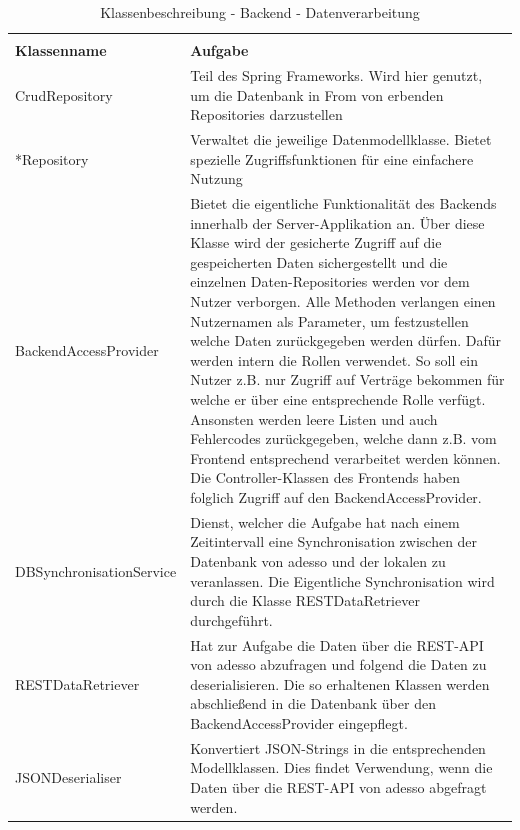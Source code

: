 \clearpage

\begin{center}
\begin{longtable}[h]{p{5cm} p{9cm}}
	\caption{Klassenbeschreibung - Backend - Datenverarbeitung}
	\label{table:klassenbeschreibung-backend-data}
	\endlastfoot
	\multicolumn{2}{r}{{Weitergeführt auf der folgenden Seite}} \\
	\endfoot
	\endhead
	\rowcolor[HTML]{C0C0C0} 
	\textbf{Klassenname} & \textbf{Aufgabe} \\
    CrudRepository & Teil des Spring Frameworks. Wird hier genutzt, um die Datenbank in From von erbenden Repositories darzustellen \\
	\rowcolor[HTML]{E7E7E7} 
	*Repository & Verwaltet die jeweilige Datenmodellklasse. Bietet spezielle Zugriffsfunktionen für eine einfachere Nutzung \\
	BackendAccessProvider & Bietet die eigentliche Funktionalität des Backends innerhalb der Server-Applikation an. Über diese Klasse wird der gesicherte Zugriff auf die gespeicherten Daten sichergestellt und die 
    einzelnen Daten-Repositories werden vor dem Nutzer verborgen. Alle Methoden verlangen einen Nutzernamen als Parameter, um festzustellen welche Daten zurückgegeben werden dürfen. Dafür werden intern die Rollen verwendet.
    So soll ein Nutzer z.B. nur Zugriff auf Verträge bekommen für welche er über eine entsprechende Rolle verfügt. Ansonsten werden leere Listen und auch Fehlercodes zurückgegeben, welche dann z.B. vom Frontend
    entsprechend verarbeitet werden können. Die Controller-Klassen des Frontends haben folglich Zugriff auf den BackendAccessProvider. \\
	\rowcolor[HTML]{E7E7E7} 
	DBSynchronisationService & Dienst, welcher die Aufgabe hat nach einem Zeitintervall eine Synchronisation zwischen der Datenbank von adesso und der lokalen zu veranlassen. Die Eigentliche Synchronisation wird
    durch die Klasse RESTDataRetriever durchgeführt. \\
    RESTDataRetriever & Hat zur Aufgabe die Daten über die REST-API von adesso abzufragen und folgend die Daten zu deserialisieren. Die so erhaltenen Klassen werden abschließend in die Datenbank über den BackendAccessProvider eingepflegt. \\
	\rowcolor[HTML]{E7E7E7} 
    JSONDeserialiser & Konvertiert JSON-Strings in die entsprechenden Modellklassen. Dies findet Verwendung, wenn die Daten über die REST-API von adesso abgefragt werden. \\
\end{longtable}
\end{center}

